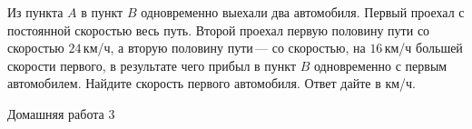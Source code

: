 \begin{class}[number=6]
	\begin{listofex}
		\item Из пункта \(A\) в пункт \(B\) одновременно выехали два автомобиля. Первый проехал с постоянной скоростью весь путь. Второй проехал первую половину пути со скоростью \(24\) км/ч, а вторую половину пути --- со скоростью, на \(16\) км/ч большей скорости первого, в результате чего прибыл в пункт \(B\) одновременно с первым автомобилем. Найдите скорость первого автомобиля. Ответ дайте в км/ч.
	\end{listofex}
\end{class}

\begin{homework}[number=3]
	\begin{listofex}
		\item Домашняя работа 3
	\end{listofex}
\end{homework}

